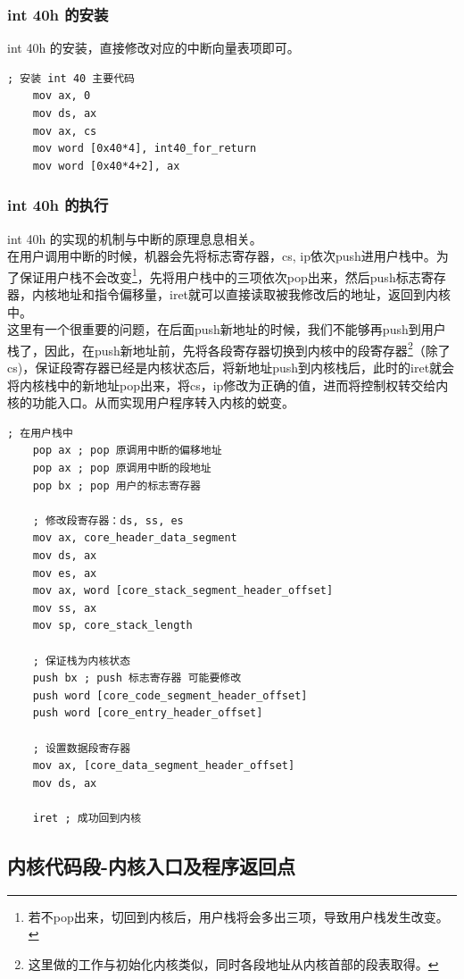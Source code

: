 \documentclass[forprint]{WHUBachelor}
\begin{document}
\subsubsection{int 40h 的安装}

int 40h 的安装，直接修改对应的中断向量表项即可。\\
  \begin{lstlisting}[language={[x86masm]Assembler}]
    ; 安装 int 40 主要代码
    mov ax, 0
    mov ds, ax
    mov ax, cs
    mov word [0x40*4], int40_for_return 
    mov word [0x40*4+2], ax
  \end{lstlisting}
\subsubsection{int 40h 的执行}  
int 40h 的实现的机制与中断的原理息息相关。\\
  在用户调用中断的时候，机器会先将标志寄存器，cs, ip依次push进用户栈中。为了保证用户栈不会改变\footnote{若不pop出来，切回到内核后，用户栈将会多出三项，导致用户栈发生改变。}，先将用户栈中的三项依次pop出来，然后push标志寄存器，内核地址和指令偏移量，iret就可以直接读取被我修改后的地址，返回到内核中。 \\
  这里有一个很重要的问题，在后面push新地址的时候，我们不能够再push到用户栈了，因此，在push新地址前，先将各段寄存器切换到内核中的段寄存器\footnote{这里做的工作与初始化内核类似，同时各段地址从内核首部的段表取得。}（除了cs)，保证段寄存器已经是内核状态后，将新地址push到内核栈后，此时的iret就会将内核栈中的新地址pop出来，将cs，ip修改为正确的值，进而将控制权转交给内核的功能入口。从而实现用户程序转入内核的蜕变。
  \begin{lstlisting}[language={[x86masm]Assembler}]
    ; 在用户栈中
    pop ax ; pop 原调用中断的偏移地址
    pop ax ; pop 原调用中断的段地址
    pop bx ; pop 用户的标志寄存器

    ; 修改段寄存器：ds, ss, es
    mov ax, core_header_data_segment
    mov ds, ax
    mov es, ax
    mov ax, word [core_stack_segment_header_offset]
    mov ss, ax
    mov sp, core_stack_length

    ; 保证栈为内核状态
    push bx ; push 标志寄存器 可能要修改
    push word [core_code_segment_header_offset]
    push word [core_entry_header_offset]

    ; 设置数据段寄存器
    mov ax, [core_data_segment_header_offset]
    mov ds, ax

    iret ; 成功回到内核
  \end{lstlisting}

\subsection{内核代码段-内核入口及程序返回点}
\end{document}
